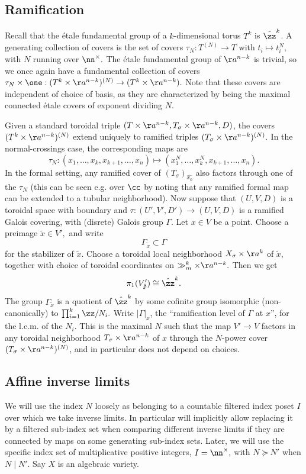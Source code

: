 \documentclass{article}
\newcommand{\sle}{\succeq}
\begin{document}
\subsection{Ramification}
Recall that the \'etale fundamental group of a $k$-dimensional torus $T^k$ is $\hat{\zz}^k$. A generating collection of covers is the set of covers $\tau_N:T^{(N)}\to T$ with $t_i\mapsto t_i^N,$ with $N$ running over $\nn^\times.$ The \'etale fundamental group of $\aa^{n-k}$ is trivial, so we once again have a fundamental collection of covers $\tau_N\times \one:(T^k\times \aa^{n-k})^{(N)}\to (T^k\times \aa^{n-k}).$ Note that these covers are independent of choice of basis, as they are characterized by being the maximal connected \'etale covers of exponent dividing $N$.

Given a standard toroidal triple $(T\times \aa^{n-k}, T_\sigma\times \aa^{n-k}, D)$, the covers $(T^k\times \aa^{n-k})^{(N)}$ extend uniquely to ramified triples $(T_\sigma\times \aa^{n-k})^{(N)}.$ In the normal-crossings case, the corresponding maps are $$\tau_N:(x_1,\dots, x_k, x_{k+1}, \dots, x_n)\mapsto (x_1^N, \dots, x_k^N, x_{k+1}, \dots, x_n).$$
In the formal setting, any ramified cover of $(T_\sigma)_{\hat{x_0}}$ also factors through one of the $\tau_N$ (this can be seen e.g. over $\cc$ by noting that any ramified formal map can be extended to a tubular neighborhood). Now suppose that $(U, V, D)$ is a toroidal space with boundary and $\tau:(U', V', D')\to (U, V, D)$ is a ramified Galois covering, with (disrete) Galois group $\Gamma$. Let $x\in V$ be a point. Choose a preimage $\tilde{x}\in V',$ and write $$\Gamma_{\tilde{x}}\subset \Gamma$$ for the stabilizer of $\tilde{x}.$ Choose a toroidal local neighborhood $X_\sigma\times \aa^k$ of $\tilde{x}$, together with choice of toroidal coordinates on $\gg_m^k\times \aa^{n-k}.$ Then we get $$\pi_1(V'_{\hat{\tilde{x}}})\cong \hat{\zz}^k.$$ The group $\Gamma_{\tilde{x}}$ is a quotient of $\hat{\zz}^k$ by some cofinite group isomorphic (non-canonically) to $\prod_{i = 1}^k \zz/N_i.$ Write $|\Gamma|_x$, the ``ramification level of $\Gamma$ at $x$'', for the l.c.m. of the $N_i$. This is the maximal $N$ such that the map $V'\to V$ factors in any toroidal neighborhood $T_\sigma\times \aa^{n-k}$ of $x$ through the $N$-power cover $(T_\sigma\times \aa^{n-k})^{(N)}$, and in particular does not depend on choices. 

\subsection{Affine inverse limits}
We will use the index $N$ loosely as belonging to a countable filtered index poset $I$ over which we take inverse limits. In particular will implicitly allow replacing it by a filtered sub-index set when comparing different inverse limits if they are connected by maps on some generating sub-index sets. Later, we will use the specific index set of multiplicative positive integers, $I = \nn^\times,$ with $N\sle N'$ when $N\mid N'.$ Say $X$ is an algebraic variety.
\end{document}
